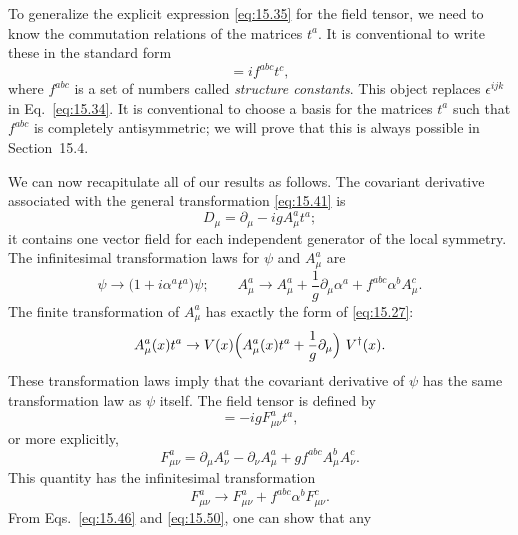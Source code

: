 To generalize the explicit expression \eqref{eq:15.35} for the field tensor,
we need to know the commutation relations of the matrices $t^a$.  It is
conventional to write these in the standard form
\begin{equation}
  [t^a, t^b] = if^{abc}t^c ,
  \label{eq:15.44}
\end{equation}
where $f^{abc}$ is a set of numbers called \emph{structure constants}.  This
object replaces $\epsilon^{ijk}$ in Eq.~\eqref{eq:15.34}.  It is conventional
to choose a basis for the matrices $t^a$ such that $f^{abc}$ is completely
antisymmetric; we will prove that this is always possible in Section~15.4.

We can now recapitulate all of our results as follows.  The covariant
derivative associated with the general transformation \eqref{eq:15.41} is
\begin{equation}
  D_\mu = \partial_\mu - igA_\mu^a t^a ;
  \label{eq:15.45}
\end{equation}
it contains one vector field for each independent generator of the local
symmetry.  The infinitesimal transformation laws for $\psi$ and $A_\mu^a$ are
\begin{equation}
  \psi \to \bigl( 1 + i\alpha^a t^a \bigr)\psi;\qquad
  A_\mu^a \to A_\mu^a + \frac{1}{g}\partial_\mu\alpha^a
    + f^{abc}\alpha^b A_\mu^c .
  \label{eq:15.46}
\end{equation}
The finite transformation of $A_\mu^a$ has exactly the form of \eqref{eq:15.27}:
\begin{equation}
  A_\mu^a(x)t^a \to V(x)\Bigl( A_\mu^a(x)t^a + \frac{1}{g}\partial_\mu
    \Bigr)\ V^{\dagger}(x) .
  \label{eq:15.47}
\end{equation}
These transformation laws imply that the covariant derivative of $\psi$ has
the same transformation law as $\psi$ itself.  The field tensor is defined by
\begin{equation}
  [D_\mu, D_\nu] = -igF^a_{\mu\nu}t^a ,
  \label{eq:15.48}
\end{equation}
or more explicitly,
\begin{equation}
  F^a_{\mu\nu} = \partial_\mu A_\nu^a - \partial_\nu A_\mu^a
    + gf^{abc}A_\mu^b A_\nu^c .
  \label{eq:15.49}
\end{equation}
This quantity has the infinitesimal transformation
\begin{equation}
  F^a_{\mu\nu} \to F^a_{\mu\nu} + f^{abc}\alpha^b F^c_{\mu\nu} .
  \label{eq:15.50}
\end{equation}
From Eqs.~\eqref{eq:15.46} and \eqref{eq:15.50}, one can show that any
